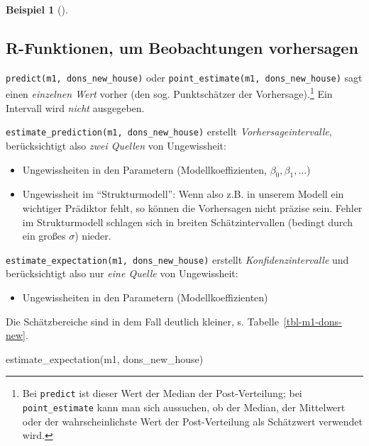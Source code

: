 \documentclass[
  ngerman,
  letterpaper,
  twoside,
  open=any]{scrbook}
\newenvironment{Shaded}{\begin{snugshade}}{\end{snugshade}}
\newcommand{\FunctionTok}[1]{\textcolor[rgb]{0.28,0.35,0.67}{#1}}
\newcommand{\NormalTok}[1]{\textcolor[rgb]{0.00,0.23,0.31}{#1}}
\providecommand{\tightlist}{%
  \setlength{\itemsep}{0pt}\setlength{\parskip}{0pt}}\usepackage{longtable,booktabs,array}
\theoremstyle{definition}
\newtheorem{example}{Beispiel}[chapter]
\theoremstyle{plain}
\theoremstyle{definition}
\theoremstyle{definition}
\theoremstyle{remark}
\begin{document}
\begin{example}[]
\begin{tcolorbox}
\end{tcolorbox}

\subsection{R-Funktionen, um Beobachtungen
vorhersagen}\label{r-funktionen-um-beobachtungen-vorhersagen}

\texttt{predict(m1,\ dons\_new\_house)} oder
\texttt{point\_estimate(m1,\ dons\_new\_house)} sagt einen
\emph{einzelnen Wert} vorher (den sog. Punktschätzer der
Vorhersage).\footnote{Bei \texttt{predict} ist dieser Wert der Median
  der Post-Verteilung; bei \texttt{point\_estimate} kann man sich
  aussuchen, ob der Median, der Mittelwert oder der wahrscheinlichste
  Wert der Post-Verteilung als Schätzwert verwendet wird.} Ein Intervall
wird \emph{nicht} ausgegeben.

\texttt{estimate\_prediction(m1,\ dons\_new\_house)} erstellt
\emph{Vorhersageintervalle}, berücksichtigt also \emph{zwei Quellen} von
Ungewissheit:

\begin{itemize}
\tightlist
\item
  Ungewissheiten in den Parametern (Modellkoeffizienten,
  \(\beta_0, \beta_1, ...\))
\item
  Ungewissheit im \enquote{Strukturmodell}: Wenn also z.B. in unserem
  Modell ein wichtiger Prädiktor fehlt, so können die Vorhersagen nicht
  präzise sein. Fehler im Strukturmodell schlagen sich in breiten
  Schätzintervallen (bedingt durch ein großes \(\sigma\)) nieder.
\end{itemize}

\texttt{estimate\_expectation(m1,\ dons\_new\_house)} erstellt
\emph{Konfidenzintervalle} und berücksichtigt also nur \emph{eine
Quelle} von Ungewissheit:

\begin{itemize}
\tightlist
\item
  Ungewissheiten in den Parametern (Modellkoeffizienten)
\end{itemize}

Die Schätzbereiche sind in dem Fall deutlich kleiner, s.
Tabelle~\ref{tbl-m1-dons-new}.

\begin{Shaded}
\begin{Highlighting}[]
\FunctionTok{estimate\_expectation}\NormalTok{(m1, dons\_new\_house)}
\end{Highlighting}
\end{Shaded}


\end{example}
\end{document}
